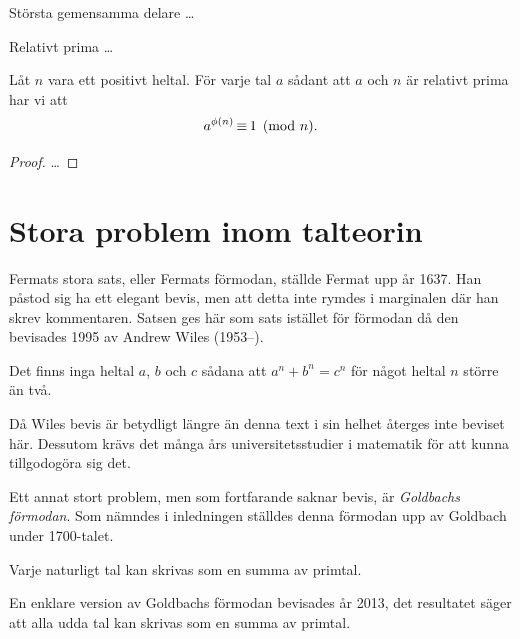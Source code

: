 \begin{definition}
  Största gemensamma delare \dots
\end{definition}
\begin{definition}
  Relativt prima \dots
\end{definition}

\begin{theorem}
  Låt \(n\) vara ett positivt heltal.
  För varje tal \(a\) sådant att \(a\) och \(n\) är relativt prima har vi att 
  \[ a^{\phi(n)} \operatorname{\equiv} 1 \pmod n. \]
\end{theorem}
\begin{proof}
  \dots
\end{proof}


\section{Stora problem inom talteorin}
Fermats stora sats, eller Fermats förmodan, ställde Fermat upp år 1637.
Han påstod sig ha ett elegant bevis, men att detta inte rymdes i marginalen där 
han skrev kommentaren.
Satsen ges här som sats istället för förmodan då den bevisades 1995 av Andrew 
Wiles (1953--).

\begin{theorem}
  Det finns inga heltal \(a\), \(b\) och \(c\) sådana att \(a^n + b^n = c^n\) 
  för något heltal \(n\) större än två.
\end{theorem}

Då Wiles bevis är betydligt längre än denna text i sin helhet återges inte 
beviset här.
Dessutom krävs det många års universitetsstudier i matematik för att kunna 
tillgodogöra sig det.

Ett annat stort problem, men som fortfarande saknar bevis, är \emph{Goldbachs 
förmodan}.
Som nämndes i inledningen ställdes denna förmodan upp av Goldbach under 
1700-talet.
\begin{conjecture}
  Varje naturligt tal kan skrivas som en summa av primtal.
\end{conjecture}
En enklare version av Goldbachs förmodan bevisades år 2013, det resultatet 
säger att alla udda tal kan skrivas som en summa av primtal.

